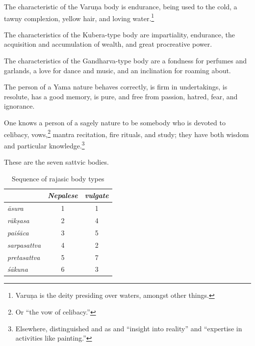\begin{translation}
The characteristic of the Varuṇa body is endurance, being used to the
cold, a tawny complexion, yellow hair, and loving
water.\footnote{Varuṇa is the deity presiding over waters, amongst
    other things.}


\item[84]

The characteristics of the Kubera-type body are impartiality,
endurance, the acquisition and accumulation of wealth, and great
procreative power.

\item[85]

The characteristics of the Gandharva-type body are a fondness for
perfumes and garlands,  a love for dance and music, and an inclination
for roaming about.

\item[86]

The person of a Yama nature behaves correctly, is firm in
undertakings, is resolute, has a good memory, is pure, and free from
passion, hatred, fear, and ignorance.

\item[87]

One knows a person of a sagely nature to be somebody who is devoted to celibacy,
vows,\footnote{Or “the vow of celibacy.”} mantra recitation, fire rituals, and
study; they have both wisdom and particular knowledge.\footnote{Elsewhere,
 distinguished  and  as
 and  “insight into reality” and
“expertise in activities like painting.”}

\item[88--89.add]

These are the seven sattvic bodies.  
\begin{table}
    \centering
    \caption{Sequence of rajasic body types}
    \label{rajasic-bodies}
    \bigskip
    \begin{tabular}{>{\it}lcc}
        & \emph{Nepalese} & \emph{vulgate} \\
        \toprule
        āsura & 1 & 1 \\   
        rākṣasa & 2 & 4 \\
        paiśāca & 3 & 5 \\
        sarpasattva & 4 & 2 \\
        pretasattva & 5 & 7 \\
        śākuna  & 6 & 3 \\
        \bottomrule
    \end{tabular}
\end{table}


\end{translation}
